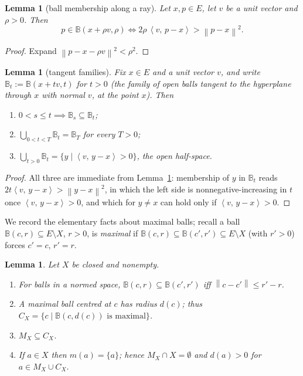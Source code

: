 \documentclass[11pt]{article}
\newtheorem{lemma}[theorem]{Lemma}
\theoremstyle{remark}
\newcommand{\B}{\mathbb{B}}
\newcommand{\X}{X}
\newcommand{\sca}[2]{\left\langle #1,\, #2\right\rangle}
\newcommand{\norm}[1]{\left\lVert #1\right\rVert}
\newcommand{\Mx}{M_{\X}}
\newcommand{\Cx}{C_{\X}}
\begin{document}
\begin{lemma}[ball membership along a ray]\label{lem:swallow}
Let $x,p\in E$, let $v$ be a unit vector and $\rho>0$. Then
\[
 p\in\B(x+\rho v,\rho)\iff 2\rho\,\sca{v}{p-x}>\norm{p-x}^2 .
\]
\end{lemma}

\begin{proof}
Expand $\norm{p-x-\rho v}^2<\rho^2$.
\end{proof}

\begin{lemma}[tangent families]\label{lem:tangent}
Fix $x\in E$ and a unit vector $v$, and write $\B_t:=\B(x+tv,t)$ for $t>0$ (the family of open
balls tangent to the hyperplane through $x$ with normal $v$, at the point $x$). Then
\begin{enumerate}[label=(\alph*),itemsep=1pt]
\item $0<s\le t\implies \B_s\subseteq \B_t$;
\item $\bigcup_{0<t<T}\B_t=\B_T$ for every $T>0$;
\item $\bigcup_{t>0}\B_t=\{y\mid\sca{v}{y-x}>0\}$, the open half-space.
\end{enumerate}
\end{lemma}

\begin{proof}
All three are immediate from Lemma~\ref{lem:swallow}: membership of $y$ in $\B_t$ reads
$2t\sca{v}{y-x}>\norm{y-x}^2$, in which the left side is nonnegative-increasing in $t$ once
$\sca{v}{y-x}>0$, and which for $y\ne x$ can hold only if $\sca{v}{y-x}>0$.
\end{proof}

We record the elementary facts about maximal balls; recall a ball
$\B(c,r)\subseteq E\setminus \X$, $r>0$, is \emph{maximal} if
$\B(c,r)\subseteq\B(c',r')\subseteq E\setminus\X$ (with $r'>0$) forces $c'=c$, $r'=r$.

\begin{lemma}\label{lem:maxballs}
Let $\X$ be closed and nonempty.
\begin{enumerate}[label=(\alph*),itemsep=1pt]
\item For balls in a normed space, $\B(c,r)\subseteq\B(c',r')$ iff $\norm{c-c'}\le r'-r$.
\item A maximal ball centred at $c$ has radius $d(c)$; thus
$\Cx=\{c\mid \B(c,d(c))\text{ is maximal}\}$.
\item $\Mx\subseteq \Cx$.
\item If $a\in \X$ then $m(a)=\{a\}$; hence $\Mx\cap \X=\emptyset$ and $d(a)>0$ for
$a\in\Mx\cup\Cx$.
\end{enumerate}
\end{lemma}
\end{document}
